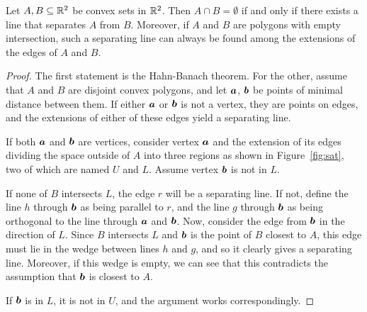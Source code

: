 \begin{theorem} \label{thm:sat}
Let $A,B\subseteq\mathbb{R}^2$ be convex sets in $\mathbb{R}^2$. Then $A \cap B=\emptyset$ if and only if there exists a
line that separates $A$ from $B$. Moreover, if $A$ and $B$ are polygons with empty intersection, such a
separating line can always be found among the extensions of the edges of $A$ and $B$.
\end{theorem}
\begin{proof}
The first statement is the Hahn-Banach theorem. For the other, assume that $A$ and $B$ are disjoint convex
polygons, and let ${\bm a}$, ${\bm b}$ be points of minimal distance between them. If either ${\bm a}$ or ${\bm b}$ is not a
vertex, they are points on edges, and the extensions of either of these edges yield a separating line. 

If both ${\bm a}$ and ${\bm b}$ are vertices, consider vertex ${\bm a}$ and the extension of its edges dividing the
space outside of $A$ into three regions as shown in Figure~\ref{fig:sat}, two of which are named $U$ and $L$.
Assume vertex ${\bm b}$ is not in $L$. 

If none of $B$ intersects $L$, the edge $r$ will be a separating line. If not, define the line $h$ through
${\bm b}$ as being parallel to $r$, and the line $g$ through ${\bm b}$ as being orthogonal to the line through ${\bm a}$
and ${\bm b}$. Now, consider the edge from ${\bm b}$ in the direction of $L$. Since $B$ intersects $L$ and ${\bm b}$ is
the point of $B$ closest to $A$, this edge must lie in the wedge between lines $h$ and $g$, and so it clearly
gives a separating line. Moreover, if this wedge is empty, we can see that this contradicts the assumption
that ${\bm b}$ is closest to $A$.

If ${\bm b}$ is in $L$, it is not in $U$, and the argument works correspondingly.
\end{proof}

